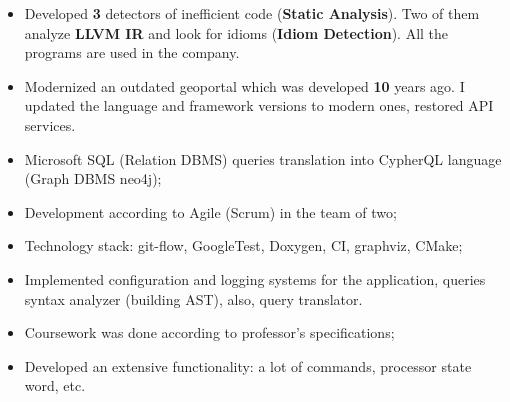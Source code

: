\documentclass[10pt,a4paper,ragged2e,withhyper]{custom-altacv}
\begin{document}
\begin{paracol}{2}



\begin{itemize}
	\item Developed \textbf{3} detectors of inefficient code (\textbf{Static Analysis}). Two of them analyze \textbf{LLVM IR} and look for idioms (\textbf{Idiom Detection}). All the programs are used in the company.
\end{itemize}

\divider


\begin{itemize}
	\item Modernized an outdated geoportal which was developed \textbf{10} years ago. I updated the language and framework versions to modern ones, restored API services.
\end{itemize}





\begin{itemize}
	\item Microsoft SQL (Relation DBMS) queries translation into CypherQL language (Graph DBMS neo4j);
	\item Development according to Agile (Scrum) in the team of two;
	\item Technology stack: git-flow, GoogleTest, Doxygen, CI, graphviz, CMake;
	\item Implemented configuration and logging systems for the application, queries syntax analyzer (building AST), also, query translator.
\end{itemize}

\divider


\begin{itemize}
	\item Coursework was done according to professor's specifications;
	\item Developed an extensive functionality: a lot of commands, processor state word, etc.
\end{itemize}




\end{paracol}
\end{document}
